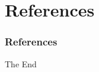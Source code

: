 \documentclass{beamer}
\begin{document}

\section{References}


\begin{frame}
\frametitle{References}
\footnotesize{

}
\end{frame}


\begin{frame}
\Huge{\centerline{The End}}
\end{frame}

\end{document}
